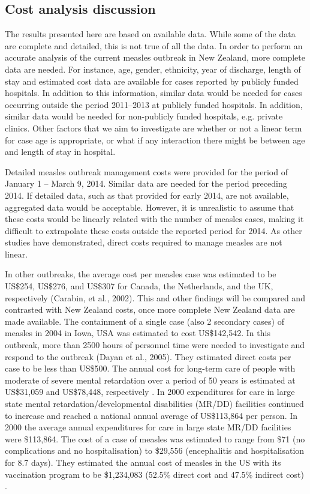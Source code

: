 \documentclass{article}
\begin{document}
{\subsection{Cost analysis discussion}
The results presented here are based on available data. While some of the data are complete and detailed, this is not true of all the data. In order to perform an accurate analysis of the current measles outbreak in New Zealand, more complete data are needed. For instance, age, gender, ethnicity, year of discharge, length of stay and estimated cost data are available for cases reported by publicly funded hospitals. In addition to this information, similar data would be needed for cases occurring outside the period 2011--2013 at publicly funded hospitals. In addition, similar data would be needed for non-publicly funded hospitals, e.g. private clinics. Other factors that we aim to investigate are whether or not a linear term for case age is appropriate, or what if any interaction there might be between age and length of stay in hospital.

Detailed measles outbreak management costs were provided for the period of January 1 -- March 9, 2014. Similar data are needed for the period preceding 2014. If detailed data, such as that provided for early 2014, are not available, aggregated data would be acceptable. However, it is unrealistic to assume that these costs would be linearly related with the number of measles cases, making it difficult to extrapolate these costs outside the reported period for 2014. As other studies have demonstrated, direct costs required to manage measles are not linear.

In other outbreaks, the average cost per measles case was estimated to be US\$254, US\$276, and US\$307 for Canada, the Netherlands, and the UK, respectively (Carabin, et al., 2002). This and other findings will be compared and contrasted with New Zealand costs, once more complete New Zealand data are made available.
The containment of a single case (also 2 secondary cases) of measles in 2004 in Iowa, USA was estimated to cost US\$142,542. In this outbreak, more than 2500 hours of personnel time were needed to investigate and respond to the outbreak (Dayan et al., 2005). They estimated direct costs per case to be less than US\$500. 
The annual cost for long-term care of people with moderate of severe mental retardation over a period of 50 years is estimated at US\$31,059 and US\$78,448, respectively \citep{prouty1}. In 2000 expenditures for care in large state mental retardation/developmental disabilities (MR/DD) facilities continued to increase and reached a national annual average of US\$113,864 per person. In 2000 the average annual expenditures for care in large state MR/DD facilities were \$113,864. The cost of a case of measles was estimated to range from \$71 (no complications and no hospitalisation) to \$29,556 (encephalitis and hospitalisation for 8.7 days). They estimated the annual cost of measles in the US with its vaccination program to be \$1,234,083 (52.5\% direct cost and 47.5\% indirect cost) \citep{zhou4}.

}
\end{document}
